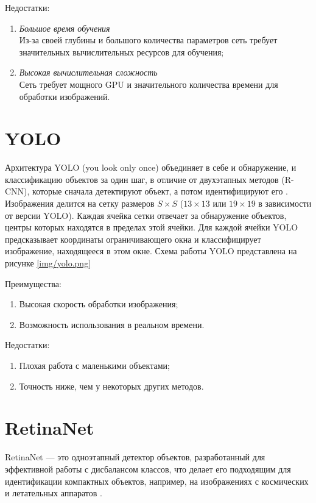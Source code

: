 Недостатки:
\begin{enumerate}
\item \textit{Большое время обучения} \\
Из-за своей глубины и большого количества параметров сеть требует значительных вычислительных ресурсов для обучения;

\item \textit{Высокая вычислительная сложность}  \\
Сеть требует мощного GPU и значительного количества времени для обработки изображений.
\end{enumerate}

\section{YOLO}
Архитектура YOLO (you look only once) объединяет в себе и обнаружение, и классификацию объектов за один шаг, в отличие от двухэтапных методов (R-CNN), которые сначала детектируют объект, а потом идентифицируют его \cite{yolo}. Изображения делится на сетку размеров $S \times S$ ($13 \times 13$ или $19 \times 19$
в зависимости от версии YOLO). Каждая ячейка сетки отвечает за обнаружение объектов, центры которых находятся в пределах этой ячейки. Для каждой ячейки YOLO предсказывает координаты ограничивающего окна и классифицирует изображение, находящееся в этом окне. Схема работы YOLO представлена на рисунке \ref{img/yolo.png}


Преимущества:
\begin{enumerate}
\item Высокая скорость обработки изображения;
\item Возможность использования в реальном времени.
\end{enumerate}

Недостатки:
\begin{enumerate}
\item Плохая работа с маленькими объектами;
\item Точность ниже, чем у некоторых других методов.
\end{enumerate}

\section{RetinaNet}
RetinaNet --- это одноэтапный детектор объектов, разработанный для эффективной работы с дисбалансом классов, что делает его подходящим для идентификации компактных объектов, например, на изображениях с космических и летательных аппаратов \cite{ret2}. 


